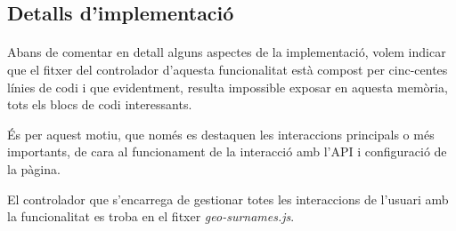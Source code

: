 \subsection{Detalls d'implementació}

    \paragraph{}
    Abans de comentar en detall alguns aspectes de la implementació, volem indicar que el fitxer del controlador d'aquesta funcionalitat està compost per cinc-centes línies de codi i que evidentment, resulta impossible exposar en aquesta memòria, tots els blocs de codi interessants.

    És per aquest motiu, que només es destaquen les interaccions principals o més importants, de cara al funcionament de la interacció amb l'API i configuració de la pàgina.

    El controlador que s'encarrega de gestionar totes les interaccions de l'usuari amb la funcionalitat es troba en el fitxer \emph{geo-surnames.js}.

    
